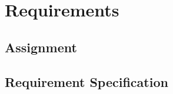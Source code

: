 \chapter{Requirements}

\section{Assignment}
\begin{figure}[H]
\end{figure}
\begin{figure}[H]
\end{figure}

\newpage
\section{Requirement Specification}
\begin{figure}[H]
\end{figure}
\begin{figure}[H]
\end{figure}
\begin{figure}[H]
\end{figure}
\begin{figure}[H]
\end{figure}

\begin{landscape}
	\begin{figure}[H]
	\end{figure}
\end{landscape}

